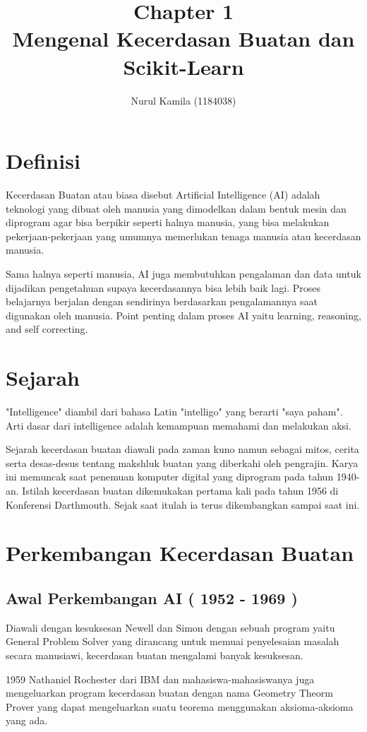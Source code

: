 \documentclass{homework}
\title{Chapter 1 \\
Mengenal Kecerdasan Buatan dan
Scikit-Learn}
\author{Nurul Kamila (1184038)}
\begin{document}
\maketitle 
\section{Definisi}
Kecerdasan Buatan atau biasa disebut Artificial Intelligence (AI) adalah teknologi yang dibuat oleh manusia yang dimodelkan dalam bentuk mesin dan diprogram agar bisa berpikir seperti halnya manusia, yang bisa melakukan pekerjaan-pekerjaan yang umumnya memerlukan tenaga manusia atau kecerdasan manusia. 

Sama halnya seperti manusia, AI juga membutuhkan pengalaman dan data untuk dijadikan pengetahuan supaya kecerdasannya bisa lebih baik lagi. Proses belajarnya berjalan dengan sendirinya berdasarkan pengalamannya saat digunakan oleh manusia. Point penting dalam proses AI yaitu learning, reasoning, and self correcting.

\section{Sejarah}
"Intelligence" diambil dari bahasa Latin "intelligo" yang berarti "saya paham". Arti dasar dari intelligence adalah kemampuan  memahami dan melakukan aksi.

Sejarah kecerdasan buatan diawali pada zaman kuno namun sebagai mitos, cerita serta desas-desus tentang makshluk buatan yang diberkahi oleh pengrajin. Karya ini memuncak saat penemuan komputer digital yang diprogram pada tahun 1940-an.
Istilah kecerdasan buatan  dikemukakan pertama kali pada tahun 1956 di Konferensi Darthmouth. Sejak saat itulah ia terus dikembangkan sampai saat ini.


\section{Perkembangan Kecerdasan Buatan}
\subsection{Awal Perkembangan AI ( 1952 - 1969 )}
Diawali dengan kesuksesan Newell dan Simon dengan sebuah program yaitu General Problem Solver yang dirancang untuk memuai penyelesaian masalah secara manusiawi, kecerdasan buatan mengalami banyak kesuksesan.

1959 Nathaniel Rochester dari IBM dan mahasiswa-mahasiswanya juga mengeluarkan program kecerdasan buatan dengan nama Geometry Theorm Prover yang dapat mengeluarkan suatu teorema menggunakan aksioma-aksioma yang ada.
\end{document}
